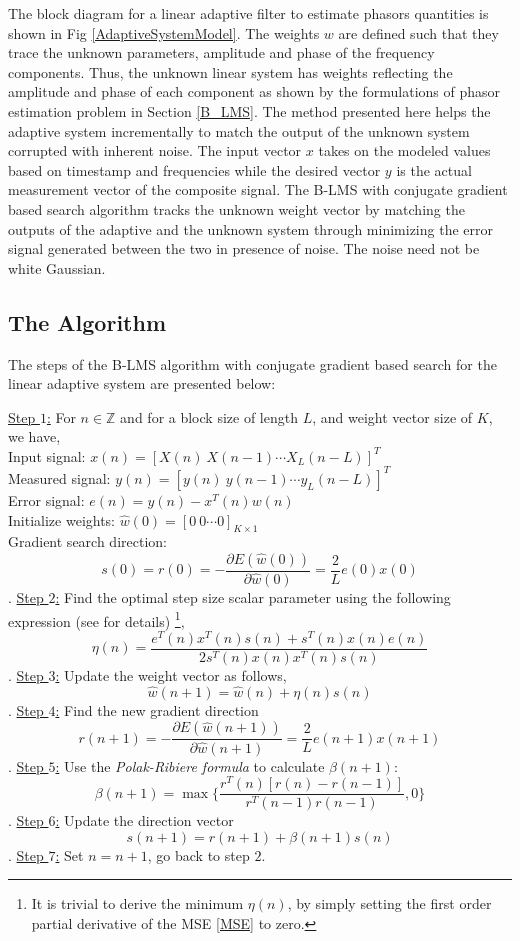 \documentclass{UCF_ETD}
\begin{document}
The block diagram for a linear adaptive filter to estimate phasors quantities is shown in Fig \ref{AdaptiveSystemModel}. The weights $w$ are defined such that they trace the unknown parameters, amplitude and phase of the frequency components. Thus, the unknown linear system has weights reflecting the amplitude and phase of each component as shown by the formulations of phasor estimation problem in Section \ref{B_LMS}. The method presented here helps the adaptive system incrementally to match the output of the unknown system corrupted with inherent noise. The input vector $x$ takes on the modeled values based on timestamp and frequencies while the desired vector $y$ is the actual measurement vector of the composite signal. The B-LMS with conjugate gradient based search  algorithm tracks the unknown weight vector by matching the outputs of the adaptive and the unknown system through minimizing the error signal generated between the two in presence of noise. The noise need not be white Gaussian.
\subsection{The Algorithm}
The steps of the B-LMS algorithm with conjugate gradient based search for the linear adaptive system are presented below:

\underline{Step $1$:} For $n \in \mathbb{Z}$ and for a block size of length $L$, and weight vector size of $K$, we have,\\
\indent Input signal: $x(n)=[X(n)~X(n-1)\cdots X_L(n-L)]^T$ \\
\indent Measured signal: $y(n)=[y(n)~y(n-1)\cdots y_L(n-L)]^T$ \\
\indent Error signal: $e(n)=y(n)-x^T(n)w(n)$ \\
\indent Initialize weights: $\hat{w}(0)=[0~0 \cdots 0]_{K \times 1}$ \\
\indent Gradient search direction:\\
\[s(0)=r(0)=-\frac{\partial E(\hat{w}(0))}{\partial\hat{w}(0)}=\frac{2}{L}e(0)x(0)\].
\underline{Step $2$:} Find the optimal step size scalar parameter using the following expression (see \cite{abbas13} for details) \footnote{It is trivial to derive the minimum $\eta(n)$, by simply setting the first order partial derivative of the MSE \eqref{MSE} to zero.},
\[\eta(n)=\frac{e^T(n)x^T(n)s(n)+s^T(n)x(n)e(n)}{2s^T(n)x(n)x^T(n)s(n)} \].
\underline{Step $3$:} Update the weight vector as follows,
\[\hat{w}(n+1)=\hat{w}(n)+\eta(n)s(n) \].
\underline{Step $4$:} Find the new gradient direction
\[ r(n+1)= -\frac{\partial E(\hat{w}(n+1))}{\partial\hat{w}(n+1)}=\frac{2}{L}e(n+1)x(n+1)\].
\underline{Step $5$:} Use the \emph{Polak-Ribiere formula} to calculate $\beta(n+1)$:
\[ \beta (n+1) = \max \{ \frac{r^T(n)[r(n)-r(n-1)]}{r^T(n-1)r(n-1)}, 0 \} \].
\underline{Step $6$:} Update the direction vector
\[ s(n+1)=r(n+1)+\beta(n+1)s(n)\].
\underline{Step $7$:} Set $n=n+1$, go back to step $2$. 
\end{document}
